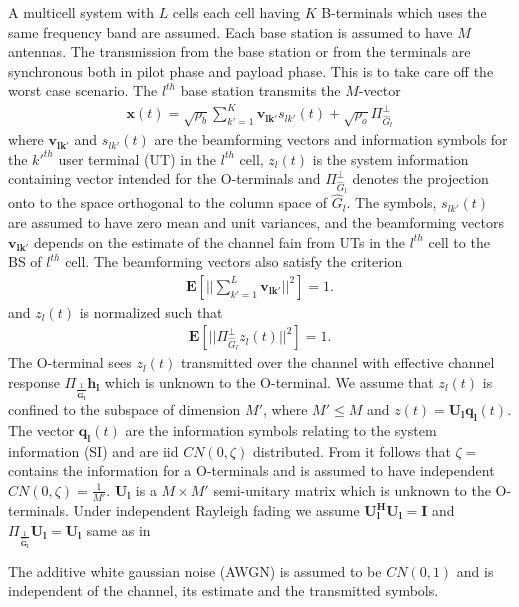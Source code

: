 \documentclass[10pt, a4paper, twoside,fleqn]{article}
\begin{document}
	A multicell system with $L$ cells each cell having $K$ B-terminals which uses the same frequency band are assumed. Each base station is assumed to have $M$ antennas. The transmission from the base station or from the terminals are synchronous both in pilot phase and payload phase. This is to take care off the worst case scenario. The $l^{th}$ base station transmits the $M$-vector
\begin{eqnarray}
	\mathbf{x}(t) = \sqrt{\rho_b}\sum\limits_{k'=1}^{K}\mathbf{v_{lk'}}s_{lk'}(t)
    		      + \sqrt{\rho_o}\Pi^{\perp}_{{\widehat{G}_l}}
\end{eqnarray}
where $\mathbf{v_{lk'}}$ and $s_{lk'}(t)$ are the beamforming vectors and information symbols for the $k'^{th}$ user terminal (UT) in the $l^{th}$ cell, $z_l(t)$ is the system information containing vector intended for the O-terminals and $\Pi^{\perp}_{{\widehat{G}_l}}$ denotes the projection onto to the space orthogonal to the column space of $\hat G_l$. The symbols, $s_{lk'}(t)$ are assumed to have zero mean and unit variances, and the beamforming vectors $\mathbf{v_{lk'}}$ depends on the estimate of the channel fain from UTs in the $l^{th}$ cell to the BS of $l^{th}$ cell. 
The beamforming vectors also satisfy the criterion
\begin{eqnarray}
	\mathbf{E}\left[||\sum\limits_{k'=1}^{L}\mathbf{v_{lk'}}||^2\right]=1.
\end{eqnarray}
and $z_l(t)$ is normalized such that
\begin{eqnarray}\label{eqn:zlcondition}
	\mathbf{E}\left[||\Pi^{\perp}_{{\widehat{G}_l}}z_l(t)||^2\right]=1.
\end{eqnarray}
The O-terminal sees $z_l(t)$ transmitted over the channel with effective channel response $\Pi_{\frac{1}{\mathbf{\hat G_l}}}\mathbf{h_l}$ which is unknown to the O-terminal. We assume that $z_l(t)$ is confined to the subspace of dimension $M'$, where $M'\leq M$ and $z(t) = \mathbf{U_lq_l}(t)$. The vector $\mathbf{q_l}(t)$ are the information symbols relating to the system information (SI) and are iid $CN(0,\zeta)$ distributed. From \cite{bib:jbb} it follows that $\zeta=$ contains the information for a O-terminals  and is assumed to have independent $CN(0, \zeta)=\frac{1}{M'}$. $\mathbf{U_l}$ is a $M\times M'$ semi-unitary matrix which is unknown to the O-terminals. Under independent Rayleigh fading we assume $\mathbf{U_l^HU_l=I}$ and $\Pi_{\frac{1}{\mathbf{\hat G_l}}}\mathbf{U_l=U_l}$ same as in \cite{bib:jbb}

The additive white gaussian noise (AWGN) is assumed to be $CN(0,1)$ and is independent of the channel, its estimate and the transmitted symbols.
\end{document}
